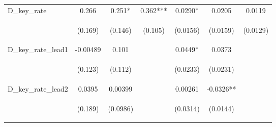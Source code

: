 \documentclass[]{article}
\begin{document}
\begin{center}
\begin{tabular}{lcccccc}
D\_key\_rate & 0.266 & 0.251* & 0.362*** & 0.0290* & 0.0205 & 0.0119 \\
\vspace{4pt} & \begin{footnotesize}(0.169)\end{footnotesize} & \begin{footnotesize}(0.146)\end{footnotesize} & \begin{footnotesize}(0.105)\end{footnotesize} & \begin{footnotesize}(0.0156)\end{footnotesize} & \begin{footnotesize}(0.0159)\end{footnotesize} & \begin{footnotesize}(0.0129)\end{footnotesize} \\
D\_key\_rate\_lead1 & -0.00489 & 0.101 &  & 0.0449* & 0.0373 &  \\
\vspace{4pt} & \begin{footnotesize}(0.123)\end{footnotesize} & \begin{footnotesize}(0.112)\end{footnotesize} & \begin{footnotesize}\end{footnotesize} & \begin{footnotesize}(0.0233)\end{footnotesize} & \begin{footnotesize}(0.0231)\end{footnotesize} & \begin{footnotesize}\end{footnotesize} \\
D\_key\_rate\_lead2 & 0.0395 & 0.00399 &  & 0.00261 & -0.0326** &  \\
\vspace{4pt} & \begin{footnotesize}(0.189)\end{footnotesize} & \begin{footnotesize}(0.0986)\end{footnotesize} & \begin{footnotesize}\end{footnotesize} & \begin{footnotesize}(0.0314)\end{footnotesize} & \begin{footnotesize}(0.0144)\end{footnotesize} & \begin{footnotesize}\end{footnotesize} \\

\end{tabular}
\end{center}
\end{document}
